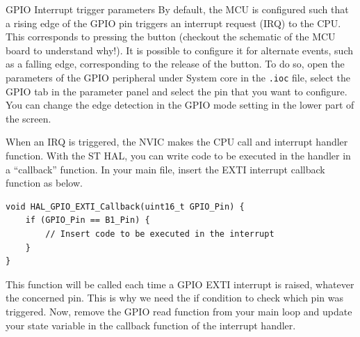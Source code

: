 \begin{bclogo}[couleur = gray!20, arrondi = 0.2, logo=\bcinfo]{GPIO Interrupt trigger parameters}
By default, the MCU is configured such that a rising edge of the GPIO pin triggers an interrupt request (IRQ) to the CPU. This corresponds to pressing the button (checkout the schematic of the MCU board to understand why!). It is possible to configure it for alternate events, such as a falling edge, corresponding to the release of the button. To do so, open the parameters of the GPIO peripheral under System core in the \texttt{.ioc} file, select the GPIO tab in the parameter panel and select the pin that you want to configure. You can change the edge detection in the GPIO mode setting in the lower part of the screen.
\end{bclogo}

When an IRQ is triggered, the NVIC makes the CPU call and interrupt handler function. With the ST HAL, you can write code to be executed in the handler in a ``callback'' function. In your main file, insert the EXTI interrupt callback function as below.

\begin{lstlisting}[columns=fullflexible]
void HAL_GPIO_EXTI_Callback(uint16_t GPIO_Pin) {
    if (GPIO_Pin == B1_Pin) {
        // Insert code to be executed in the interrupt
    }
}
\end{lstlisting}
This function will be called each time a GPIO EXTI interrupt is raised, whatever the concerned pin. This is why we need the if condition to check which pin was triggered. Now, remove the GPIO read function from your main loop and update your state variable in the callback function of the interrupt handler.

